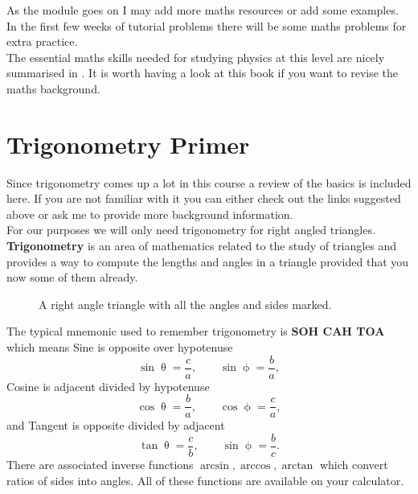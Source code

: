 \documentclass[a4paper,12pt]{book}
\begin{document}
As the module goes on I may add more maths resources or add some examples. In the first few weeks of tutorial problems there will be some maths problems for extra practice.\\

The essential maths skills needed for studying physics at this level are nicely summarised in \citep{garrett2015essential}. It is worth having a look at this book if you want to revise the maths background.

\section{Trigonometry Primer}
Since trigonometry comes up a lot in this course a review of the basics is included here. If you are not familiar with it you can either check out the links suggested above or ask me to provide more background information.\\

For our purposes we will only need trigonometry for right angled triangles. \textbf{Trigonometry} is an area of mathematics related to the study of triangles and provides a way to compute the lengths and angles in a triangle provided that you now some of them already.

\begin{figure}[ht]
    \centering
    \caption{A right angle triangle with all the angles and sides marked.}
    \label{fig: Trig definitions}
\end{figure}

The typical mnemonic used to remember trigonometry is \textbf{SOH CAH TOA} which means Sine is opposite over hypotenuse
\begin{equation*}
\sin\uptheta=\frac{c}{a}, \qquad \sin\upphi =\frac{b}{a},
\end{equation*}
Cosine is adjacent divided by hypotenuse
\begin{equation*}
\cos\uptheta=\frac{b}{a}, \qquad \cos\upphi =\frac{c}{a},
\end{equation*}
and Tangent is opposite divided by adjacent
\begin{equation*}
\tan\uptheta=\frac{c}{b}, \qquad \sin\upphi =\frac{b}{c}.
\end{equation*}
There are associated inverse functions $\arcsin,\arccos,\arctan$ which convert ratios of sides into angles. All of these functions are available on your calculator. \\
\end{document}

